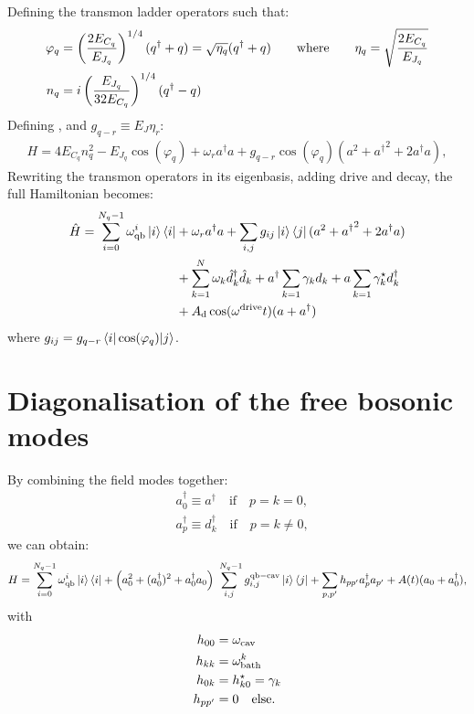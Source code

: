 \documentclass[prb]{revtex4}
\newcommand{\eq}[1]{\begin{align}#1\end{align}}
\begin{document}
Defining the transmon ladder operators such that:
\eq{
\varphi_q &= \left( \frac{2E_{C_q}}{E_{J_q}} \right)^{1/4} ( q^\dag + q ) = \sqrt{\eta_q} ( q^\dag + q ) \quad \quad {\rm where}  \quad \quad \eta_q= \sqrt{\frac{2E_{C_q}}{E_{J_q}}}  \notag \\
 n_q &= i\left( \frac{E_{J_q}}{32E_{C_q}} \right)^{1/4}  ( q^\dag - q ) 
 }
Defining , and $g_{q-r} \equiv E_J\eta_r$:
%
\eq{
H= 4 E_{C_q} n_q^2 - E_{J_q} \cos(\varphi_q) + \omega_r a^\dag a + g_{q-r}\cos(\varphi_q)(a^2 + {a^\dag}^2 +  2 a^\dag a ),
}
Rewriting the transmon operators in its eigenbasis, adding drive and decay, the full Hamiltonian becomes:
%
\eq{
\hat H = \sum_{i=0}^{N_q-1} \omega_{\rm qb }^i \ket{i} \bra{i} &+ \omega_r a^\dag a  + \sum_{i,j} g_{ij}\ket{i}\bra{j} (a^2 + {a^\dag}^2 +  2 a^\dag a ) \notag \\
&+\sum_{k=1}^{N} \omega_k \hat d_k^\dag \hat d_k +a^\dag \sum_{k=1} \gamma_k d_k+a \sum_{k=1} \gamma_k^\star d_k^\dag  \notag \\
&+A_{\rm d} \cos(\omega^{\rm drive}t) (a+a^\dag)
}
where $g_{ij} = g_{q-r} \braket{ i | \cos(\varphi_q) | j } $.


\section{ Diagonalisation of the free bosonic modes }


By combining the field modes together:
\eq{
&a_0^\dag \equiv a^\dag \quad \text{if}\quad  p=k=0,\\
&a_p^\dag \equiv d_k^\dag \quad \text{if}\quad  p=k \ne 0,
}
we can obtain:
\eq{
H = \sum_{i=0}^{ N_q-1} \omega_{\rm qb }^i \ket{i} \bra{i}  + \Big( a_0^2+(a_0^\dag)^2 +  a_0^\dag a_0 \Big)  \sum_{i,j}^{\ N_q-1} g^{\rm qb-cav}_{i,j}\ket{i}\bra{j} + \sum_{p,p'} h_{p p'} a_p^\dag a_{p'} + A(t) (a_0+a_0^\dag) ,
}
with 
\eq{
h_{00} &= \omega_{\rm cav} \notag\\
h_{kk} &= \omega^k_{\rm bath} \notag\\
h_{0k} &= h_{k0}^\star =  \gamma_k \notag\\
h_{pp'} &= 0 \quad {\rm else}.
}
\end{document}
